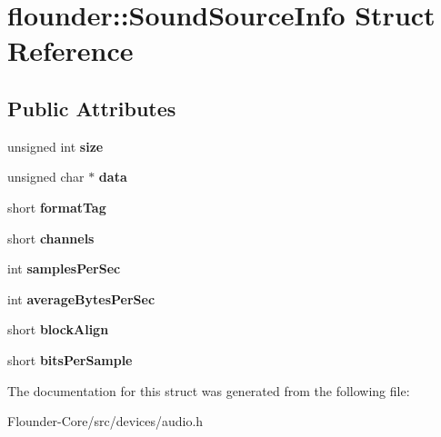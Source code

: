 \hypertarget{structflounder_1_1_sound_source_info}{}\section{flounder\+:\+:Sound\+Source\+Info Struct Reference}
\label{structflounder_1_1_sound_source_info}
\subsection*{Public Attributes}
\begin{DoxyCompactItemize}
\item 
\mbox{\label{structflounder_1_1_sound_source_info_ae5dfcf06ff56c082a2e7c5cb410064c7}} 
unsigned int {\bfseries size}
\item 
\mbox{\label{structflounder_1_1_sound_source_info_a85be812f0fdad5f6df3842b3daec952f}} 
unsigned char $\ast$ {\bfseries data}
\item 
\mbox{\label{structflounder_1_1_sound_source_info_a71c096aceae0834bd129deb52f386b87}} 
short {\bfseries format\+Tag}
\item 
\mbox{\label{structflounder_1_1_sound_source_info_a4151e9a1518b1d0b7a5bf182e7e8cdeb}} 
short {\bfseries channels}
\item 
\mbox{\label{structflounder_1_1_sound_source_info_a50f498ac59d6b3bc85e8a36e9d892c7a}} 
int {\bfseries samples\+Per\+Sec}
\item 
\mbox{\label{structflounder_1_1_sound_source_info_a1bb508df84859552f3e8017eae5ad9d2}} 
int {\bfseries average\+Bytes\+Per\+Sec}
\item 
\mbox{\label{structflounder_1_1_sound_source_info_a5f4c71bdbbf04e9b1288daf58317a405}} 
short {\bfseries block\+Align}
\item 
\mbox{\label{structflounder_1_1_sound_source_info_a74d521a08f96c31710687dcacb1f3a4e}} 
short {\bfseries bits\+Per\+Sample}
\end{DoxyCompactItemize}


The documentation for this struct was generated from the following file\+:\begin{DoxyCompactItemize}
\item 
Flounder-\/\+Core/src/devices/audio.\+h\end{DoxyCompactItemize}
